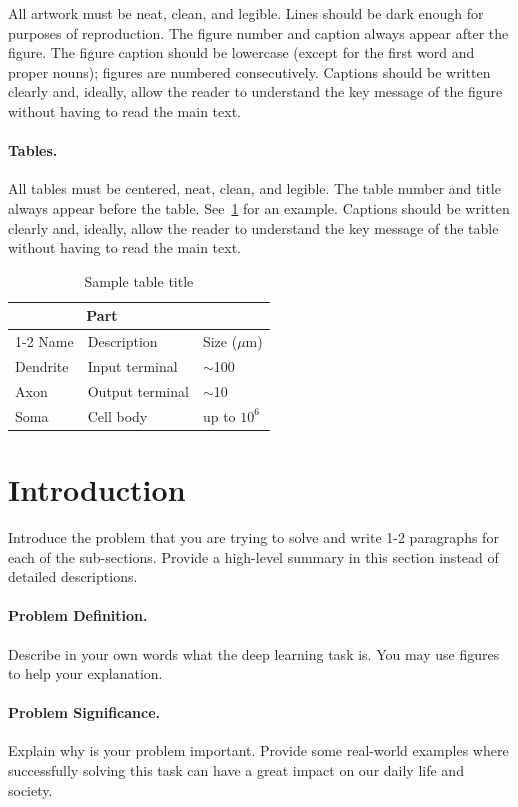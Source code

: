 \documentclass{article}
\begin{document}
All artwork must be neat, clean, and legible. Lines should be dark enough for
purposes of reproduction. The figure number and caption always appear after the figure. The figure caption should be lowercase (except for the first word and
proper nouns); figures are numbered consecutively. Captions should be written clearly and, ideally, allow the reader to understand the key message of the figure without having to read the main text.


\paragraph{Tables.}
All tables must be centered, neat, clean, and legible.  The table number and
title always appear before the table. See~\cref{sample-table} for an example.
Captions should be written clearly and, ideally, allow the reader to understand the key message of the table without having to read the main text.
\begin{table}[h]
  \caption{Sample table title}
  \label{sample-table}
  \centering
  \begin{tabular}{lll}
    \toprule
    \multicolumn{2}{c}{Part}                   \\
    \cmidrule(r){1-2}
    Name     & Description     & Size ($\mu$m) \\
    \midrule
    Dendrite & Input terminal  & $\sim$100     \\
    Axon     & Output terminal & $\sim$10      \\
    Soma     & Cell body       & up to $10^6$  \\
    \bottomrule
  \end{tabular}
\end{table}

\section{Introduction}
\label{sec:intro}
Introduce the problem that you are trying to solve and write 1-2 paragraphs for each of the sub-sections.  Provide a high-level summary in this section instead of detailed descriptions.
\paragraph{Problem Definition.}
Describe in your own words what the deep learning task is.  You may use figures to help your explanation.

\paragraph{Problem Significance.}
Explain  why is your problem important. Provide some real-world examples where successfully solving this task can have a great impact on our daily life and society.
\end{document}
